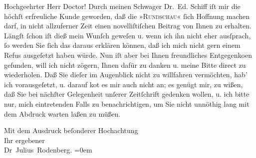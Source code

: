 \pstart{}Hochgeehrter Herr Doctor!\pend\vspace{0.5em}
\pstart
           Durch meinen Schwager Dr. Ed. Schiff iſt mir
               die höchſt erfreuliche Kunde geworden, daß die »\textsc{Rundschau}«{ }ſich Hoffnung machen darf, in nicht allzuferner Zeit einen novelliſtiſchen
               Beitrag von Ihnen zu erhalten. Längſt{ }ſchon iſt dieß mein Wunſch geweſen u. wenn ich
               ihn nicht eher ausſprach,{ }ſo werden Sie{ }ſich das daraus erklären können, daß ich mich
               nicht gern einem Refus ausgeſetzt haben würde. Nun iſt aber bei Ihnen freundliches
                  Entgegenko{\geminationm}en gefunden, will ich nicht zögern, Ihnen
               dafür zu danken u. meine Bitte direct zu wiederholen. Daß Sie dieſer im Augenblick
               nicht zu willfahren vermöchten, hab’ ich vorausgeſetzt, u. darauf ko{\geminationm}t es mir auch nicht an; es genügt mir, zu wißen, daß
               Sie bei nächſter Gelegenheit unſerer Zeitſchrift gedenken wollen, u. {\pb}ich bitte nur, mich eintretenden Falls zu
               benachrichtigen, um Sie nicht unnöthig lang mit dem Abdruck warten laßen zu
               müßen.\pend
           
\pstart
           Mit dem Ausdruck beſonderer Hochachtung{\\[\baselineskip]}Ihr ergebener{\\[\baselineskip]}\spacefill\mbox{Dr Julius Rodenberg.}\pend
           \leftskip=0em{}\endnumbering{}  \newcommand{\dateiname}{L00749}\newcommand{\titel}{Julius Rodenberg an Arthur Schnitzler, 13. 12. 1897}\newcommand{\editorInnen}{Martin Anton Müller und Gerd-Hermann Susen}
